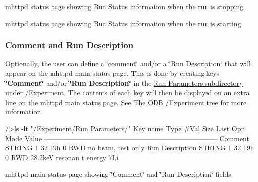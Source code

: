 \begin{center} mhttpd status page showing Run Status information when the run is stopping  \end{center} \par


\begin{center} mhttpd status page showing Run Status information when the run is starting  \end{center} \par


\par


\par
 \hypertarget{RC_mhttpd_status_page_features_RC_Edit_RP}{}\subsubsection{Comment and Run Description}\label{RC_mhttpd_status_page_features_RC_Edit_RP}
Optionally, the user can define a \char`\"{}comment\char`\"{} and/or a \char`\"{}Run Description\char`\"{} that will appear on the mhttpd main status page. This is done by creating keys {\bfseries \char`\"{}Comment\char`\"{}} and/or {\bfseries \char`\"{}Run Description\char`\"{}} in the \hyperlink{RC_customize_ODB_RC_Run_Parameters}{Run Parameters subdirectory} under /Experiment. The contents of each key will then be displayed on an extra line on the mhttpd main status page. See \hyperlink{RC_customize_ODB_RC_ODB_Experiment_Tree}{The ODB /Experiment tree} for more information.


\begin{DoxyCode}
/>ls -lt "/Experiment/Run Parameters/"
Key name                        Type    #Val  Size  Last Opn Mode Value
---------------------------------------------------------------------------
Comment                         STRING  1     32    19h  0   RWD   no beam, test 
      only
Run Description                 STRING  1     32    19h  0   RWD  28.2keV resonan
      t energy 7Li
\end{DoxyCode}


\par
 \begin{center} mhttpd main status page showing \char`\"{}Comment\char`\"{} and \char`\"{}Run Description\char`\"{} fields  \end{center}  \par


\par


